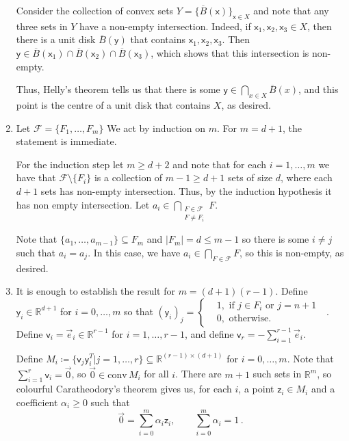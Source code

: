 \documentclass[kulak]{tplt}
\theoremstyle{definition}
\newcommand{\R}{\mathbb{R}}
\newcommand{\FF}{\mathcal F}
\newcommand{\vv}{\mathsf{v}}
\newcommand{\vx}{\mathsf{x}}
\newcommand{\vy}{\mathsf{y}}
\newcommand{\vz}{\mathsf{z}}
\newcommand{\conv}{\mathrm{conv}}
\begin{document}
\begin{enumerate}
Consider the collection of convex sets $Y = \{\overline{B}(\vx)\}_{\vx \in X}$ and note that any three sets in $Y$ have a non-empty intersection.
Indeed, if $\vx_1, \vx_2, \vx_3 \in X$, then there is a unit disk $\overline{B}(\vy)$ that contains $\vx_1, \vx_2, \vx_3$.
Then $\vy \in \overline{B}(\vx_1)\cap \overline{B}(\vx_2) \cap \overline{B}(\vx_3)$, which shows that this intersection is non-empty.

Thus, Helly's theorem tells us that there is some $\vy \in \bigcap_{x \in X} \overline{B}(x) $, and this point is the centre of a unit disk that contains $X$, as desired.


\item 
Let $\FF = \{F_1, \ldots, F_m\} $
We act by induction on $m$.
For $m = d+1$, the statement is immediate.

For the induction step let $m \geq d+2$ and note that for each $i = 1, \ldots, m$ we have that $\FF \setminus  \{ F_i\} $ is a collection of $m-1\geq d+1$ sets of size $d$, where each $d+1$ sets has non-empty intersection.
Thus, by the induction hypothesis it has non empty intersection.
Let $a_i \in \bigcap_{\substack{ F \in \FF  \\ F \neq F_i }} F $.

Note that $\{a_1, \ldots, a_{m-1}\} \subseteq F_m$ and $|F_m| =d \leq m-1$ so there is some $i \neq j $ such that $a_i = a_j$.
In this case, we have $a_i \in \bigcap_{F \in \FF } F$, so this is non-empty, as desired.


\item 
It is enough to establish the result for $m = (d+1)(r-1)$.
Define $\vy_i \in \R^{d+1}$ for $i = 0, \ldots, m$ so that $(\vy_i)_j = \begin{cases}&1, \text{ if $j \in F_i$ or $j = n+1$ } \\  &0, \text{ otherwise.}\end{cases}$.
Define $\vv_i = \vec{e}_i \in\R^{r-1}$ for $i = 1, \ldots, r-1$, and define $\vv_r = - \sum_{i=1}^{r-1} \vec{e}_i$.

Define $M_i \coloneqq \{\vv_j\vy^T_i | j=1, \ldots, r \} \subseteq \R^{(r-1) \times (d+1)}$ for $i = 0, \ldots, m$.
Note that $\sum_{i=1}^r \vv_i = \vec{0}$, so $\vec{0} \in \conv \, M_i$ for all $i$.
There are $m+1$ such sets in $\R^m$, so colourful Caratheodory's theorem gives us, for each $i$, a point $\vz_i\in M_i$ and a coefficient $\alpha_i\geq 0$ such that 
\begin{equation}\label{eq:col}
 \vec{0} = \sum_{i=0}^m \alpha_i \vz_i , \quad \quad \sum_{i=0}^m \alpha_i = 1\, . 
\end{equation}


\end{enumerate}
\end{document}
